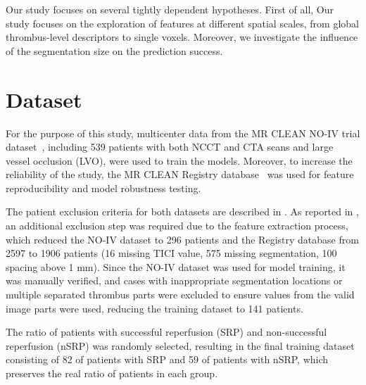 \documentclass[preprint,12pt]{elsarticle}
\begin{document}
Our study focuses on several tightly dependent hypotheses. First of all, 
Our study focuses on the exploration of features at different spatial scales, from global thrombus-level descriptors to single voxels. Moreover, we investigate the influence of the segmentation size on the prediction success.





\section{Dataset}

For the purpose of this study, multicenter data from the MR CLEAN NO-IV trial dataset~\cite{Jansen2018}, including 539 patients with both NCCT and CTA scans and large vessel occlusion (LVO), were used to train the models. Moreover, to increase the reliability of the study, the MR CLEAN Registry database~\cite{IvoGHJansen20180309} was used for feature reproducibility and model robustness testing. 

The patient exclusion criteria for both datasets are described in \cite{Mojtahedi2024}. As reported in \cite{Nemcekova2025}, an additional exclusion step was required due to the feature extraction process, which reduced the NO-IV dataset to 296 patients and the Registry database from 2597 to 1906 patients (16 missing TICI value, 575 missing segmentation, 100 spacing above 1 mm). Since the NO-IV dataset was used for model training, it was manually verified, and cases with inappropriate segmentation locations or multiple separated thrombus parts were excluded to ensure values from the valid image parts were used, reducing the training dataset to 141 patients. 

The ratio of patients with successful reperfusion (SRP) and non-successful reperfusion (nSRP) was randomly selected, resulting in the final training dataset consisting of 82 of patients with SRP and 59 of patients with nSRP, which preserves the real ratio of patients in each group.  
\end{document}
